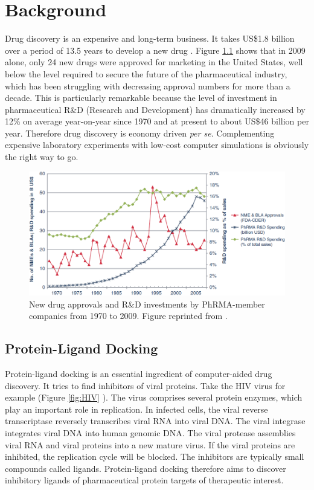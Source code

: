 \chapter{Background}

Drug discovery is an expensive and long-term business. It takes US\$1.8 billion over a period of 13.5 years to develop a new drug \citep{716}. Figure \ref{fig:NewDrugApprovals} \citep{686} shows that in 2009 alone, only 24 new drugs were approved for marketing in the United States, well below the level required to secure the future of the pharmaceutical industry, which has been struggling with decreasing approval numbers for more than a decade. This is particularly remarkable because the level of investment in pharmaceutical R\&D (Research and Development) has dramatically increased by 12\% on average year-on-year since 1970 and at present to about US\$46 billion per year. Therefore drug discovery is economy driven \textit{per se}. Complementing expensive laboratory experiments with low-cost computer simulations is obviously the right way to go.

\begin{figure}
\centering
\includegraphics[width=\textwidth]{Background/NewDrugApprovals.png}
\caption{New drug approvals and R\&D investments by PhRMA-member companies from 1970 to 2009. Figure reprinted from \citep{686}.}
\label{fig:NewDrugApprovals}
\end{figure}

\section{Protein-Ligand Docking}

Protein-ligand docking is an essential ingredient of computer-aided drug discovery. It tries to find inhibitors of viral proteins. Take the HIV virus for example (Figure \ref{fig:HIV} \citep{296}). The virus comprises several protein enzymes, which play an important role in replication. In infected cells, the viral reverse transcriptase reversely transcribes viral RNA into viral DNA. The viral integrase integrates viral DNA into human genomic DNA. The viral protease assemblies viral RNA and viral proteins into a new mature virus. If the viral proteins are inhibited, the replication cycle will be blocked. The inhibitors are typically small compounds called ligands. Protein-ligand docking therefore aims to discover inhibitory ligands of pharmaceutical protein targets of therapeutic interest.

